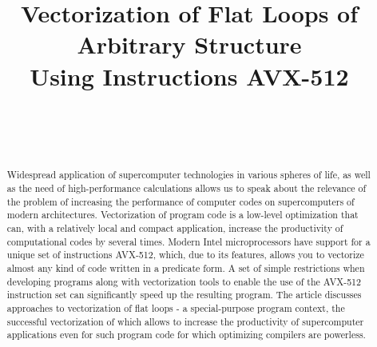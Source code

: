 \documentclass[
11pt,%
tightenlines,%
twoside,%
onecolumn,%
nofloats,%
nobibnotes,%
nofootinbib,%
superscriptaddress,%
noshowpacs,%
centertags]%
{revtex4}
\begin{document}

\title{Vectorization of Flat Loops of Arbitrary Structure\\Using Instructions AVX-512}

\author{~}

\author{~}



\begin{abstract}
Widespread application of supercomputer technologies in various spheres of life, as well as the need of high-performance calculations allows us to speak about the relevance of the problem of increasing the performance of computer codes on supercomputers of modern architectures.
Vectorization of program code is a low-level optimization that can, with a relatively local and compact application, increase the productivity of computational codes by several times.
Modern Intel microprocessors have support for a unique set of instructions AVX-512, which, due to its features, allows you to vectorize almost any kind of code written in a predicate form.
A set of simple restrictions when developing programs along with vectorization tools to enable the use of the AVX-512 instruction set can significantly speed up the resulting program.
The article discusses approaches to vectorization of flat loops - a special-purpose program context, the successful vectorization of which allows to increase the productivity of supercomputer applications even for such program code for which optimizing compilers are powerless.
\end{abstract}


\end{document}
